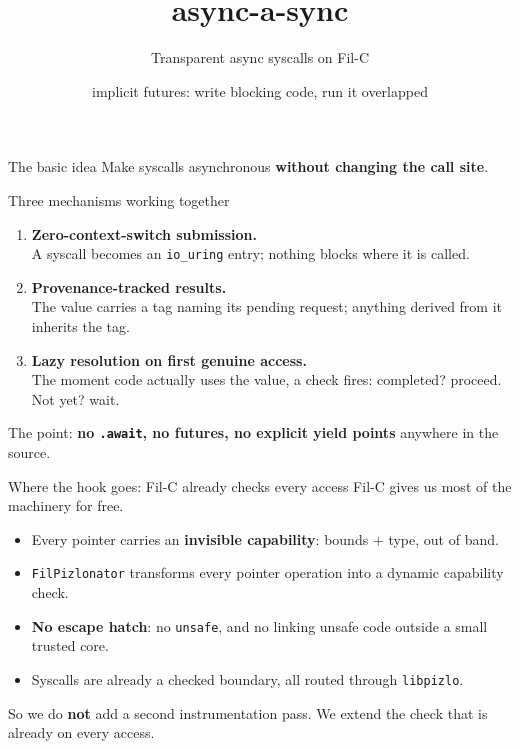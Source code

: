 \documentclass[aspectratio=169]{beamer}
\title{async-a-sync}
\subtitle{Transparent async syscalls on Fil-C}
\author{implicit futures: write blocking code, run it overlapped}
\date{}
\begin{document}
\begin{frame}
  \titlepage
\end{frame}

\begin{frame}{The basic idea}
  Make syscalls asynchronous \textbf{without changing the call site}.

  \begin{block}{Three mechanisms working together}
    \begin{enumerate}
      \item \textbf{Zero-context-switch submission.}\\
        A syscall becomes an \texttt{io\_uring} entry; nothing blocks where it is called.
      \item \textbf{Provenance-tracked results.}\\
        The value carries a tag naming its pending request; anything derived from it inherits the tag.
      \item \textbf{Lazy resolution on first genuine access.}\\
        The moment code actually uses the value, a check fires: completed? proceed. Not yet? wait.
    \end{enumerate}
  \end{block}

  The point: \textbf{no \texttt{.await}, no futures, no explicit yield points} anywhere in the source.
\end{frame}

\begin{frame}{Where the hook goes: Fil-C already checks every access}
  Fil-C gives us most of the machinery for free.

  \begin{itemize}
    \item Every pointer carries an \textbf{invisible capability}: bounds + type, out of band.
    \item \texttt{FilPizlonator} transforms every pointer operation into a dynamic capability check.
    \item \textbf{No escape hatch}: no \texttt{unsafe}, and no linking unsafe code outside a small trusted core.
    \item Syscalls are already a checked boundary, all routed through \texttt{libpizlo}.
  \end{itemize}

  \vspace{4pt}
  So we do \textbf{not} add a second instrumentation pass. We extend the check that is already on every access.
\end{frame}
\end{document}
